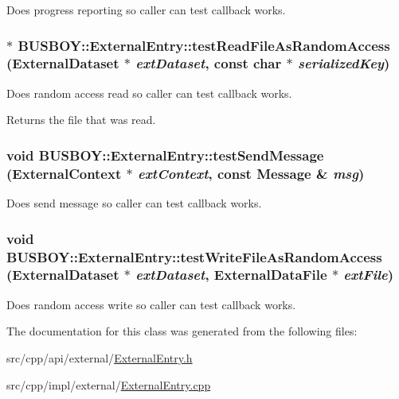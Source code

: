 Does progress reporting so caller can test callback works. \hypertarget{classBUSBOY_1_1ExternalEntry_ae3aed65cc3c2de18595decdaae55e40a}{
\subsubsection[{testReadFileAsRandomAccess}]{ $\ast$ BUSBOY::ExternalEntry::testReadFileAsRandomAccess ({\bf ExternalDataset} $\ast$ {\em extDataset}, \/  const char $\ast$ {\em serializedKey})}}
\label{classBUSBOY_1_1ExternalEntry_ae3aed65cc3c2de18595decdaae55e40a}


Does random access read so caller can test callback works. \begin{DoxyReturn}{Returns}
the file that was read. 
\end{DoxyReturn}
\hypertarget{classBUSBOY_1_1ExternalEntry_a91bf31952208a10fd6ddc7b4a28b659a}{
\subsubsection[{testSendMessage}]{\setlength{\rightskip}{0pt plus 5cm}void BUSBOY::ExternalEntry::testSendMessage ({\bf ExternalContext} $\ast$ {\em extContext}, \/  const {\bf Message} \& {\em msg})}}
\label{classBUSBOY_1_1ExternalEntry_a91bf31952208a10fd6ddc7b4a28b659a}


Does send message so caller can test callback works. \hypertarget{classBUSBOY_1_1ExternalEntry_afd1490faaaab28027da0eb0cc9118ef2}{
\subsubsection[{testWriteFileAsRandomAccess}]{\setlength{\rightskip}{0pt plus 5cm}void BUSBOY::ExternalEntry::testWriteFileAsRandomAccess ({\bf ExternalDataset} $\ast$ {\em extDataset}, \/  {\bf ExternalDataFile} $\ast$ {\em extFile})}}
\label{classBUSBOY_1_1ExternalEntry_afd1490faaaab28027da0eb0cc9118ef2}


Does random access write so caller can test callback works. 

The documentation for this class was generated from the following files:\begin{DoxyCompactItemize}
\item 
src/cpp/api/external/\hyperlink{ExternalEntry_8h}{ExternalEntry.h}\item 
src/cpp/impl/external/\hyperlink{ExternalEntry_8cpp}{ExternalEntry.cpp}\end{DoxyCompactItemize}
